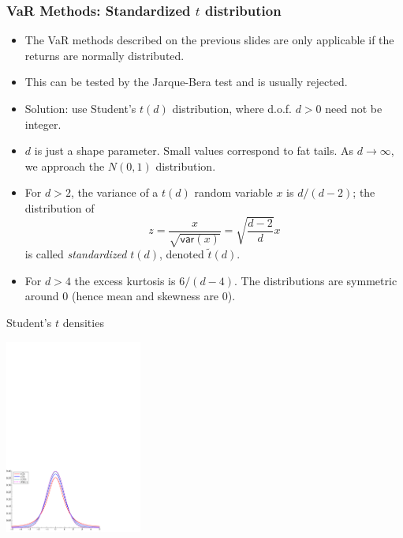 \begin{frame}%

\frametitle{VaR Methods: Standardized $t$ distribution}

\begin{itemize}
\item The VaR methods described on the previous slides are only applicable if the
returns are normally distributed.

\item This can be tested by the Jarque-Bera test and is usually rejected.
\item Solution: use Student's $t(d)$ distribution, where d.o.f. $d>0$ need not be integer.

\item $d$ is just a shape parameter. Small values correspond to fat tails. As $d\rightarrow \infty $, we approach the $N(0,1)$ distribution.
\item For $d>2$, the variance of a $t(d)$ random variable $x$ is $d/(d-2)$;
the distribution of
\begin{equation*}
z=\frac{x}{\sqrt{\mathsf{var}(x)}}=\sqrt{\frac{d-2}{d}}x
\end{equation*}
is called \emph{\color{red}standardized }$t(d)$, denoted $\tilde{t}(d)$.

\item For $d>4$ the excess kurtosis is $6/(d-4)$. The distributions are
symmetric around $0$ (hence mean and skewness are $0$).
\end{itemize}

\end{frame}%

\begin{frame}%

\begin{block}{Student's $t$ densities}
\centerline{\includegraphics[height=2.5in]{Student}}
\end{block}

\end{frame}%

